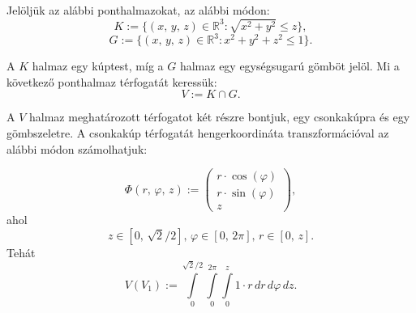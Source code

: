 \documentclass[12pt]{article}
\newcommand{\R}{\mathbb{R}}
\begin{document}

    Jelöljük az alábbi ponthalmazokat, az alábbi módon:
    \[
        K := \{ (x, \, y, \, z) \in \R^3 : \sqrt{x^2 + y^2} \leq z \},
    \]
    \[
        G := \{ (x, \, y, \, z) \in \R^3 : x^2 + y^2 + z^2 \leq 1 \}.
    \]

    A $K$ halmaz egy kúptest, míg a $G$ halmaz egy egységsugarú gömböt jelöl. Mi a következő ponthalmaz térfogatát keressük:
    \[
        V := K \cap G.
    \]

    A $V$ halmaz meghatározott térfogatot két részre bontjuk, egy csonkakúpra és egy gömbszeletre. A csonkakúp térfogatát hengerkoordináta transzformációval az alábbi módon számolhatjuk:

    \[
    \Phi(r, \, \varphi, \, z) :=
    \begin{pmatrix}
        r \cdot \cos(\varphi) \\
        r \cdot \sin(\varphi) \\
        z
    \end{pmatrix},
    \]
    ahol
    \[
        z \in [0, \, \sqrt{2} / 2], \, \varphi \in [0, \, 2 \pi], \, r \in [0, \, z].
    \]
    Tehát
    \[
        V(V_1) := \int\limits_0^{\sqrt{2}/2}\int\limits_0^{2\pi}\int\limits_0^z 1 \cdot r \, dr \, d\varphi \, dz.
    \]
\end{document}
